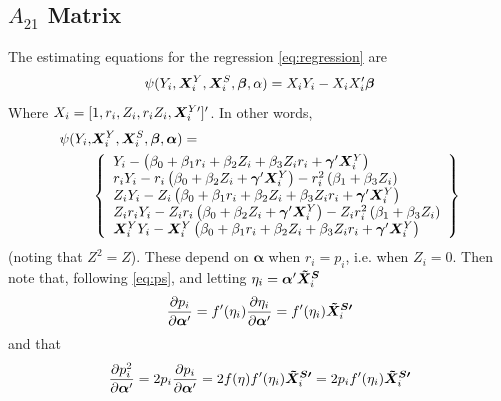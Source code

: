 \documentclass{statsoc} %
\begin{document}
\subsection{$A_{21}$ Matrix}
The estimating equations for the regression \eqref{eq:regression} are
\begin{equation}\label{eq:eeOLS}
  \psi(Y_i,\bm{X}^Y_i,\bm{X}^S_i,\bm{\beta},\alpha)=X_iY_i-X_iX_i'\bm{\beta}
\end{equation}
Where $X_i=[1,r_i,Z_i,r_iZ_i,\bm{X}^{Y\prime}_i]'$.
In other words,
\begin{align*}
  \psi(Y_i,&\bm{X}^Y_i,\bm{X}^S_i,\bm{\beta},\bm{\alpha})=\\
  &\left\{
  \begin{array}{l}
    Y_i-\left(\beta_0+\beta_1r_i+\beta_2Z_i+\beta_3Z_ir_i+\bm{\gamma}'\bm{X}^Y_i\right)\\
    r_iY_i-r_i\left(\beta_0+\beta_2Z_i+\bm{\gamma}'\bm{X}^Y_i\right)-r_i^2\left(\beta_1+\beta_3Z_i\right)\\
    Z_iY_i-Z_i\left(\beta_0+\beta_1r_i+\beta_2Z_i+\beta_3Z_ir_i+\bm{\gamma}'\bm{X}^Y_i\right)\\
    Z_ir_iY_i-Z_ir_i\left(\beta_0+\beta_2Z_i+\bm{\gamma}'\bm{X}^Y_i\right)-Z_ir_i^2\left(\beta_1+\beta_3Z_i\right)\\
    \bm{X}^Y_iY_i-\bm{X}^Y_i\left(\beta_0+\beta_1r_i+\beta_2Z_i+\beta_3Z_ir_i+\bm{\gamma}'\bm{X}^Y_i\right)
  \end{array}
  \right\}
\end{align*}
(noting that $Z^2=Z$).
These depend on $\bm{\alpha}$ when $r_i=p_i$, i.e. when $Z_i=0$.%
Then note that, following \eqref{eq:ps}, and letting $\eta_i=\bm{\alpha}'\bm{\tilde{X}^S}_i$
\begin{equation}\label{eq:derivP}
  \frac{\partial p_i}{\partial \bm{\alpha}'}=f'(\eta_i)\frac{\partial \eta_i}{\partial \bm{\alpha}'}=f'(\eta_i)\bm{\tilde{X}^{S\prime}}_i
\end{equation}
and that
\begin{equation}
  \frac{\partial p_i^2}{\partial \bm{\alpha}'}=2p_i\frac{\partial p_i}{\partial \bm{\alpha}'}=2f(\eta)f'(\eta_i)\bm{\tilde{X}^{S\prime}}_i=2p_if'(\eta_i)\bm{\tilde{X}^{S\prime}}_i
\end{equation}
\end{document}
